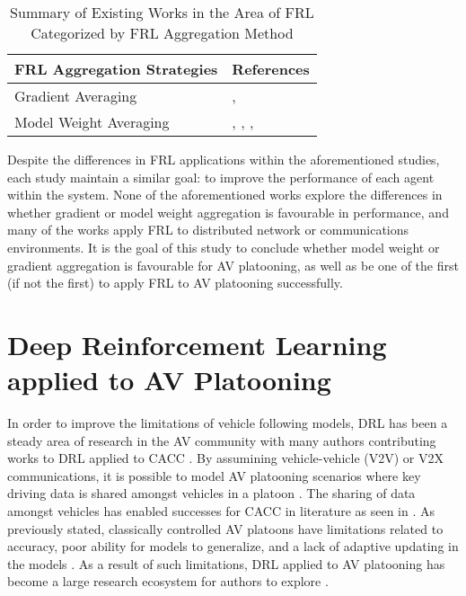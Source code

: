 \begin{table}[H]
  \centering
  \caption{Summary of Existing Works in the Area of FRL Categorized by FRL Aggregation Method}
    \begin{tabular}{ll} \toprule
    \textbf{FRL Aggregation Strategies} & \textbf{References} \\ \midrule
    \midrule
    Gradient Averaging & \cite{BrendanMcMahan2017a}, \cite{LimHyun2021} \\
    Model Weight Averaging & \cite{Liang2019}, \cite{ZhangX2020}, \cite{WangXiaofei2021}, \cite{Huang2021} \\ \bottomrule
    \end{tabular}%
  \label{tab:addlabel}%
\end{table}%


Despite the differences in FRL applications within the aforementioned studies, each study
maintain a similar goal: to improve the performance of each agent within the system.  None
of the aforementioned works explore the differences in whether gradient or model weight
aggregation is favourable in performance, and many of the works apply FRL to distributed
network or communications environments.  It is the goal of this study to conclude whether
model weight or gradient aggregation is favourable for AV platooning, as well as be one of
the first (if not the first) to apply FRL to AV platooning successfully.

\section{Deep Reinforcement Learning applied to AV Platooning} \label{sec:avRL}

In order to improve the limitations of vehicle following models, DRL has been a
steady area of research in the AV community with many authors contributing works
to DRL applied to CACC \cite{Schwarting2018, Li2019, Kendall2019, zhangYuxiang2020}.
By assumining vehicle-vehicle (V2V) or V2X communications, it is possible to model AV platooning scenarios
where key driving data is shared amongst vehicles in a platoon \cite{Schwarting2018,Hussain2019}.
The sharing of data amongst vehicles has enabled successes for CACC in literature as seen in \cite{LeiV2x}.
As previously stated, classically controlled AV platoons have limitations related to
accuracy, poor ability for models to generalize, and a lack of adaptive updating in the models \cite{Zhu2018}.
As a result of such limitations, DRL applied to AV platooning has become a large
research ecosystem for authors to explore \cite{Vinitsky2018, Kiran2020}.

